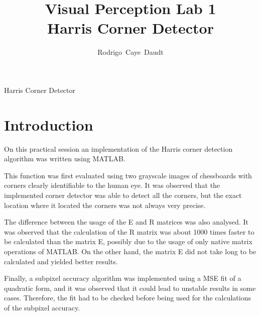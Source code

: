 \documentclass[11pt,oneside,a4paper]{article}
\begin{document}
\title{Visual Perception Lab 1 \\ Harris Corner Detector}
%
%
\author{Rodrigo~Caye~Daudt}


%
{Harris Corner Detector}


\maketitle







\section{Introduction}


On this practical session an implementation of the Harris corner detection algorithm was written using MATLAB.

This function was first evaluated using two grayscale images of chessboards with corners clearly identifiable to the human eye. It was observed that the implemented corner detector was able to detect all the corners, but the exact location where it located the corners was not always very precise.

The difference between the usage of the E and R matrices was also analysed. It was observed that the calculation of the R matrix was about 1000 times faster to be calculated than the matrix E, possibly due to the usage of only native matrix operations of MATLAB. On the other hand, the matrix E did not take long to be calculated and yielded better results.

Finally, a subpixel accuracy algorithm was implemented using a MSE fit of a quadratic form, and it was observed that it could lead to unstable results in some cases. Therefore, the fit had to be checked before being used for the calculations of the subpixel accuracy.


%




%
%
\end{document}
